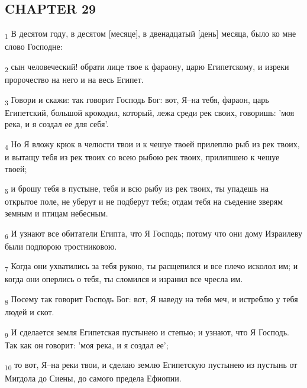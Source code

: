 \subsection{CHAPTER 29}
\begin{tcolorbox}
\textsubscript{1} В десятом году, в десятом [месяце], в двенадцатый [день] месяца, было ко мне слово Господне:
\end{tcolorbox}
\begin{tcolorbox}
\textsubscript{2} сын человеческий! обрати лице твое к фараону, царю Египетскому, и изреки пророчество на него и на весь Египет.
\end{tcolorbox}
\begin{tcolorbox}
\textsubscript{3} Говори и скажи: так говорит Господь Бог: вот, Я--на тебя, фараон, царь Египетский, большой крокодил, который, лежа среди рек своих, говоришь: 'моя река, и я создал ее для себя'.
\end{tcolorbox}
\begin{tcolorbox}
\textsubscript{4} Но Я вложу крюк в челюсти твои и к чешуе твоей прилеплю рыб из рек твоих, и вытащу тебя из рек твоих со всею рыбою рек твоих, прилипшею к чешуе твоей;
\end{tcolorbox}
\begin{tcolorbox}
\textsubscript{5} и брошу тебя в пустыне, тебя и всю рыбу из рек твоих, ты упадешь на открытое поле, не уберут и не подберут тебя; отдам тебя на съедение зверям земным и птицам небесным.
\end{tcolorbox}
\begin{tcolorbox}
\textsubscript{6} И узнают все обитатели Египта, что Я Господь; потому что они дому Израилеву были подпорою тростниковою.
\end{tcolorbox}
\begin{tcolorbox}
\textsubscript{7} Когда они ухватились за тебя рукою, ты расщепился и все плечо исколол им; и когда они оперлись о тебя, ты сломился и изранил все чресла им.
\end{tcolorbox}
\begin{tcolorbox}
\textsubscript{8} Посему так говорит Господь Бог: вот, Я наведу на тебя меч, и истреблю у тебя людей и скот.
\end{tcolorbox}
\begin{tcolorbox}
\textsubscript{9} И сделается земля Египетская пустынею и степью; и узнают, что Я Господь. Так как он говорит: 'моя река, и я создал ее';
\end{tcolorbox}
\begin{tcolorbox}
\textsubscript{10} то вот, Я--на реки твои, и сделаю землю Египетскую пустынею из пустынь от Мигдола до Сиены, до самого предела Ефиопии.
\end{tcolorbox}
